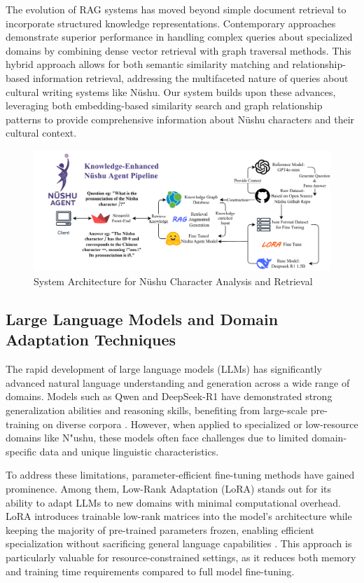 \documentclass{article}
\begin{document}
    The evolution of RAG systems has moved beyond simple document retrieval to incorporate structured knowledge representations. Contemporary approaches demonstrate superior performance in handling complex queries about specialized domains by combining dense vector retrieval with graph traversal methods. This hybrid approach allows for both semantic similarity matching and relationship-based information retrieval, addressing the multifaceted nature of queries about cultural writing systems like N\"{u}shu. Our system builds upon these advances, leveraging both embedding-based similarity search and graph relationship patterns to provide comprehensive information about N\"{u}shu characters and their cultural context.

    \begin{figure}[htb]
    \centering
    \includegraphics[width=\textwidth]{images/nvshu_system.drawio.pdf}
    \caption{System Architecture for N\"{u}shu Character Analysis and Retrieval}
    \label{fig:nvshu_system_architecture}
    \end{figure}


\subsection{Large Language Models and Domain Adaptation Techniques}
\label{ssec:llm_lora}
    The rapid development of large language models (LLMs) has significantly advanced natural language understanding and generation across a wide range of domains. Models such as Qwen and DeepSeek-R1 have demonstrated strong generalization abilities and reasoning skills, benefiting from large-scale pre-training on diverse corpora \cite{baiQwenTechnicalReport2023, deepseek-aiDeepSeekR1IncentivizingReasoning2025}. However, when applied to specialized or low-resource domains like N"{u}shu, these models often face challenges due to limited domain-specific data and unique linguistic characteristics.

    To address these limitations, parameter-efficient fine-tuning methods have gained prominence. Among them, Low-Rank Adaptation (LoRA) stands out for its ability to adapt LLMs to new domains with minimal computational overhead. LoRA introduces trainable low-rank matrices into the model's architecture while keeping the majority of pre-trained parameters frozen, enabling efficient specialization without sacrificing general language capabilities \cite{huLoRALowRankAdaptation2021}. This approach is particularly valuable for resource-constrained settings, as it reduces both memory and training time requirements compared to full model fine-tuning.
\end{document}
